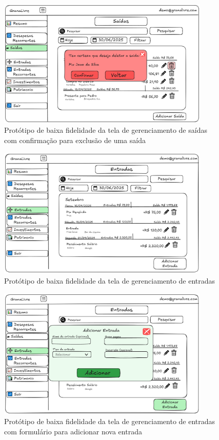 \begin{figure}[H]
    \centering
    \includegraphics[width=0.9\textwidth]{imgs/05-saidas5.png}
    \caption{Protótipo de baixa fidelidade da tela de gerenciamento de saídas com confirmação para exclusão de uma saída}
    \label{fig:prot_saidax5}
\end{figure}

\begin{figure}[H]
    \centering
    \includegraphics[width=0.9\textwidth]{imgs/06-entradas.png}
    \caption{Protótipo de baixa fidelidade da tela de gerenciamento de entradas}
    \label{fig:prot_entradas}
\end{figure}

\begin{figure}[H]
    \centering
    \includegraphics[width=0.9\textwidth]{imgs/06-entradas2.png}
    \caption{Protótipo de baixa fidelidade da tela de gerenciamento de entradas com formulário para adicionar nova entrada}
    \label{fig:prot_entradas2}
\end{figure}

